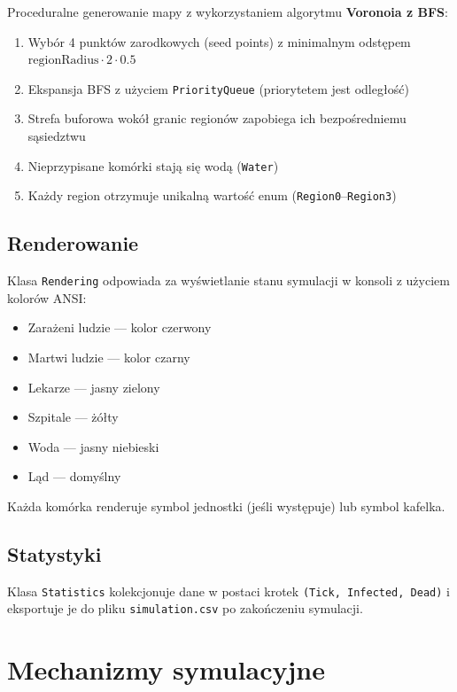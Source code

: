 \documentclass[a4paper,12pt]{article}
\begin{document}
Proceduralne generowanie mapy z wykorzystaniem algorytmu \textbf{Voronoia z BFS}:

\begin{enumerate}
    \item Wybór 4 punktów zarodkowych (seed points) z minimalnym odstępem
          $\text{regionRadius} \cdot 2 \cdot 0.5$
    \item Ekspansja BFS z użyciem \texttt{PriorityQueue} (priorytetem jest odległość)
    \item Strefa buforowa wokół granic regionów zapobiega ich bezpośredniemu sąsiedztwu
    \item Nieprzypisane komórki stają się wodą (\texttt{Water})
    \item Każdy region otrzymuje unikalną wartość enum (\texttt{Region0}--\texttt{Region3})
\end{enumerate}

\subsection{Renderowanie}

Klasa \texttt{Rendering} odpowiada za wyświetlanie stanu symulacji w konsoli z użyciem
kolorów ANSI:

\begin{itemize}
    \item Zarażeni ludzie --- kolor czerwony
    \item Martwi ludzie --- kolor czarny
    \item Lekarze --- jasny zielony
    \item Szpitale --- żółty
    \item Woda --- jasny niebieski
    \item Ląd --- domyślny
\end{itemize}

Każda komórka renderuje symbol jednostki (jeśli występuje) lub symbol kafelka.

\subsection{Statystyki}

Klasa \texttt{Statistics} kolekcjonuje dane w postaci krotek
\texttt{(Tick, Infected, Dead)} i eksportuje je do pliku \texttt{simulation.csv}
po zakończeniu symulacji.

\section{Mechanizmy symulacyjne}
\end{document}
